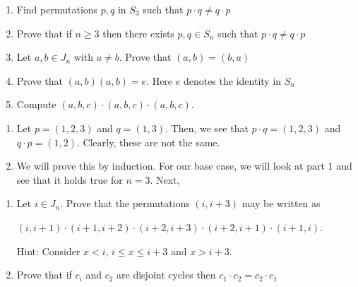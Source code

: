 \documentclass[12pt,letterpaper,cm]{hmcpset}
\begin{document}

\begin{problem}[A1]
    \begin{enumerate}
        \item Find permutations $p,q$ in $S_3$ such that $p\cdot q \neq q\cdot p$
        \item Prove that if $n\geq 3$ then there exists $p,q \in S_n$ such that $p\cdot q \neq q\cdot p$
        \item Let $a,b\in J_n$ with $a\neq b$. Prove that $(a,b) = (b,a)$
        \item Prove that $(a,b)(a,b) = e$. Here $e$ denotes the identity in $S_n$
        \item Compute $(a,b,c)\cdot(a,b,c)\cdot(a,b,c)$.
    \end{enumerate}
 \end{problem}

\begin{solution}
    \begin{enumerate}
        \item Let $p=(1,2,3)$ and $q=(1,3)$. Then, we see that $p\cdot q = (1,2,3)$ and $q\cdot p = (1,2)$. Clearly, these are not the same.
        \item We will prove this by induction. For our base case, we will look at part 1 and see that it holds true for $n=3$. Next, 
    \end{enumerate}
\end{solution}

\pagebreak

\begin{problem}[A2]
    \begin{enumerate}
        \item Let $i\in J_n$. Prove that the permutations $(i,i+3)$ may be written as
        \begin{center}
            $(i,i+1)\cdot(i+1,i+2)\cdot(i+2,i+3)\cdot(i+2,i+1)\cdot(i+1,i)$.\\
        \end{center}
        Hint: Consider $x<i$, $i\leq x \leq i+3$ and $x>i+3$.
        \item Prove that if $c_i$ and $c_2$ are disjoint cycles then $c_1\cdot c_2 = c_2 \cdot c_1$
    \end{enumerate}
\end{problem}
\end{document}
